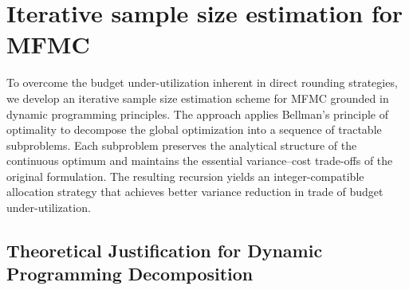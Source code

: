 \section{Iterative sample size estimation for MFMC}\label{sec:Iterative_IntegerValued_Sample_Size}
To overcome the budget under-utilization inherent in direct rounding strategies, we develop an iterative sample size estimation scheme for MFMC grounded in dynamic programming principles. The approach applies Bellman’s principle of optimality \cite{Be:1957} to decompose the global optimization into a sequence of tractable subproblems. Each subproblem preserves the analytical structure of the continuous optimum and maintains the essential variance–cost trade-offs of the original formulation. The resulting recursion yields an integer-compatible allocation strategy that achieves better variance reduction in trade of budget under-utilization.





\subsection{Theoretical Justification for Dynamic Programming Decomposition}


